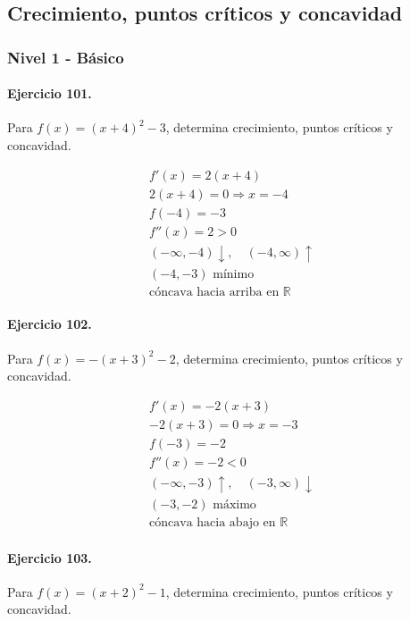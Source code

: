 \documentclass[11pt,a4paper]{article}
\begin{document}
\newpage

\subsection*{Crecimiento, puntos críticos y concavidad}


\subsubsection*{Nivel 1 - Básico}

\paragraph{Ejercicio 101.} Para $f(x)=(x+4)^2-3$, determina crecimiento, puntos críticos y concavidad.

\[
\begin{aligned}
f'(x)=2(x+4)\\
2(x+4)=0\Rightarrow x=-4\\
f(-4)=-3\\
f''(x)=2>0\\
(-\infty,-4)\downarrow,\quad(-4,\infty)\uparrow\\
(-4,-3)\text{ mínimo}\\
\text{{cóncava hacia arriba en }}\mathbb{R}
\end{aligned}
\]


\paragraph{Ejercicio 102.} Para $f(x)=-(x+3)^2-2$, determina crecimiento, puntos críticos y concavidad.

\[
\begin{aligned}
f'(x)=-2(x+3)\\
-2(x+3)=0\Rightarrow x=-3\\
f(-3)=-2\\
f''(x)=-2<0\\
(-\infty,-3)\uparrow,\quad(-3,\infty)\downarrow\\
(-3,-2)\text{ máximo}\\
\text{{cóncava hacia abajo en }}\mathbb{R}
\end{aligned}
\]


\paragraph{Ejercicio 103.} Para $f(x)=(x+2)^2-1$, determina crecimiento, puntos críticos y concavidad.
\end{document}
